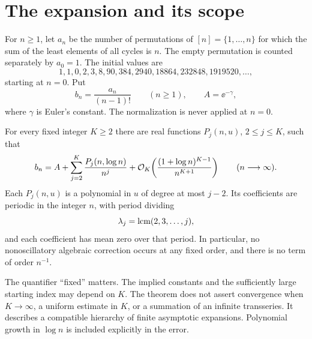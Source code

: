 \section{The expansion and its scope}\label{cms:sec:results}
For $n\geq1$, let $a_n$ be the number of permutations of $[n]=\{1,\ldots,n\}$ for which the sum of the least elements of all cycles is $n$. The empty permutation is counted separately by $a_0=1$. The initial values are
\[
1,1,0,2,3,8,90,384,2940,18864,232848,1919520,\ldots,
\]
starting at $n=0$. Put
\begin{equation}\label{cms:eq:normalization}
b_n=\frac{a_n}{(n-1)!}\qquad(n\geq1),\qquad A=\ee^{-\gamma},
\end{equation}
where $\gamma$ is Euler's constant. The normalization is never applied at $n=0$.

\begin{theorem}\label{cms:thm:main}
For every fixed integer $K\geq2$ there are real functions $P_j(n,u)$, $2\leq j\leq K$, such that
\begin{equation}\label{cms:eq:main}
b_n=A+\sum_{j=2}^{K}\frac{P_j(n,\log n)}{n^j}
 +\mathcal O_K\!\left(\frac{(1+\log n)^{K-1}}{n^{K+1}}\right)
 \qquad(n\longrightarrow\infty).
\end{equation}
Each $P_j(n,u)$ is a polynomial in $u$ of degree at most $j-2$. Its coefficients are periodic in the integer $n$, with period dividing
\[
\lambda_j=\operatorname{lcm}(2,3,\ldots,j),
\]
and each coefficient has mean zero over that period. In particular, no nonoscillatory algebraic correction occurs at any fixed order, and there is no term of order $n^{-1}$.
\end{theorem}

The quantifier ``fixed'' matters. The implied constants and the sufficiently large starting index may depend on $K$. The theorem does not assert convergence when $K\to\infty$, a uniform estimate in $K$, or a summation of an infinite transseries. It describes a compatible hierarchy of finite asymptotic expansions. Polynomial growth in $\log n$ is included explicitly in the error.

